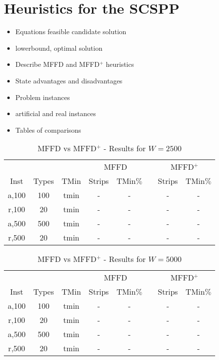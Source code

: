 \documentclass{elsarticle}
\begin{document}
\section{Heuristics for the SCSPP}
\begin{itemize}
	\item Equations feasible candidate solution
	\item lowerbound, optimal solution
	\item Describe MFFD and MFFD$^+$ heuristics
	\item State advantages and disadvantages
	\item Problem instances
	\item artificial and real instances
	\item Tables of comparisons
\end{itemize}

\begin{table}[h!]
	\centering
	\caption{MFFD vs MFFD$^+$ - Results for $W=2500$}
	\begin{tabular}{cccccccc}\toprule
		& & &\multicolumn{2}{c}{MFFD} &\phantom{a}& \multicolumn{2}{c}{MFFD$^+$}\\
		\cmidrule{4-5} \cmidrule{7-8}
		Inst & Types &TMin & Strips & TMin$\%$ && Strips & TMin$\%$\\ \midrule	
		a,100 & 100 & tmin & - & - && - & - \\
		r,100 & 20 & tmin & - & - && - & -\\
		\midrule
		a,500 & 500 & tmin & - & - && - & -\\
		r,500 & 20 & tmin & - & - && - & -\\
		\bottomrule
	\end{tabular}	
	\label{table:MFFD2500}
\end{table}

\begin{table}[h!]
	\centering
	\caption{MFFD vs MFFD$^+$ - Results for $W=5000$}
	\begin{tabular}{cccccccc}\toprule
		& & &\multicolumn{2}{c}{MFFD} &\phantom{a}& \multicolumn{2}{c}{MFFD$^+$}\\
		\cmidrule{4-5} \cmidrule{7-8}
		Inst & Types &TMin & Strips & TMin$\%$ && Strips & TMin$\%$\\ \midrule	
		a,100 & 100 & tmin & - & - && - & - \\
		r,100 & 20 & tmin & - & - && - & -\\
		\midrule
		a,500 & 500 & tmin & - & - && - & -\\
		r,500 & 20 & tmin & - & - && - & -\\
		\bottomrule
	\end{tabular}	
	\label{table:MFFD5000}
\end{table}
\end{document}
